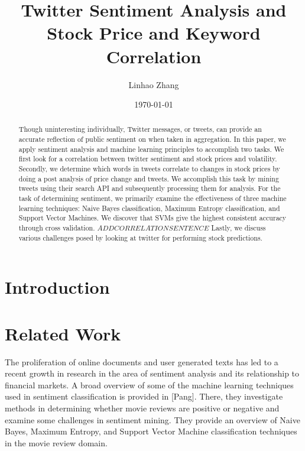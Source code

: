 \documentclass[preprint,pre,floats,aps,amsmath,amssymb,12pt]{revtex4}
\begin{document}
\title{Twitter Sentiment Analysis and Stock Price and Keyword Correlation}
\author{Linhao Zhang}
\date{\today}

\begin{abstract}

Though uninteresting individually, Twitter messages, or tweets, can provide an accurate reflection of public sentiment on when taken in aggregation. In this paper, we apply sentiment analysis and machine learning principles to accomplish two tasks. We first look for a correlation between twitter sentiment and stock prices and volatility. Secondly, we determine which words in tweets correlate to changes in stock prices by doing a post analysis of price change and tweets. We accomplish this task by mining tweets using their search API and subsequently processing them for analysis. For the task of determining sentiment, we primarily examine the effectiveness of three machine learning techniques: Naive Bayes classification, Maximum Entropy classification, and Support Vector Machines. We discover that SVMs give the highest consistent accuracy through cross validation. $ADD CORRELATION SENTENCE$ Lastly, we discuss various challenges posed by looking at twitter for performing stock predictions. 

\end{abstract}

\maketitle

\section{Introduction}
\label{sec:intro}




\section{Related Work}
\label{sec:rel}
The proliferation of online documents and user generated texts has led to a recent growth in research in the area of sentiment analysis and its relationship to financial markets. A broad overview of some of the machine learning techniques used in sentiment classification is provided in [Pang]. There, they investigate methods in determining whether movie reviews are positive or negative and examine some challenges in sentiment mining. They provide an overview of Naive Bayes, Maximum Entropy, and Support Vector Machine classification techniques in the movie review domain. 
\end{document}
